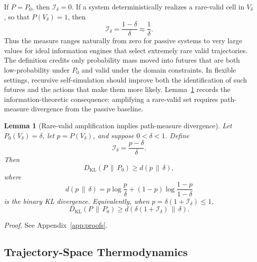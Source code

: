 \documentclass[
  aps,
  prresearch,
  reprint,
  amsmath,
  amssymb,
  superscriptaddress,
  nofootinbib,
  longbibliography
]{revtex4-2}
\newtheorem{lemma}{Lemma}
\newcommand{\KL}{D_{\mathrm{KL}}}
\newcommand{\calI}{\mathcal{I}}
\begin{document}
If \(P=P_0\), then \(\calI_\delta=0\). If a system deterministically realizes a rare-valid cell in \(V_\delta\), so that \(P(V_\delta)=1\), then
\begin{equation}
    \calI_\delta
    =
    \frac{1-\delta}{\delta}
    \approx
    \frac{1}{\delta}.
\end{equation}
Thus the measure ranges naturally from zero for passive systems to very large values for ideal information engines that select extremely rare valid trajectories. The definition credits only probability mass moved into futures that are both low-probability under \(P_0\) and valid under the domain constraints. In flexible settings, recursive self-simulation should improve both the identification of such futures and the actions that make them more likely. Lemma~\ref{lem:rare_valid_binary_kl} records the information-theoretic consequence: amplifying a rare-valid set requires path-measure divergence from the passive baseline.
\begin{lemma}[Rare-valid amplification implies path-measure divergence]
\label{lem:rare_valid_binary_kl}
Let \(P_0(V_\delta)=\delta\), let \(p=P(V_\delta)\), and suppose \(0<\delta<1\). Define
\begin{equation}
    \calI_\delta
    =
    \frac{p-\delta}{\delta}.
\end{equation}
Then
\begin{equation}
    \KL(P\,\|\,P_0)
    \geq
    d(p\,\|\,\delta),
    \label{eq:binary_kl_bridge}
\end{equation}
where
\begin{equation}
    d(p\,\|\,\delta)
    =
    p\log\frac{p}{\delta}
    +
    (1-p)\log\frac{1-p}{1-\delta}
\end{equation}
is the binary KL divergence. Equivalently, when \(p=\delta(1+\calI_\delta)\leq1\),
\begin{equation}
    \KL(P\,\|\,P_0)
    \geq
    d\!\left(\delta(1+\calI_\delta)\,\|\,\delta\right).
    \label{eq:Idelta_kl_bridge}
\end{equation}
\end{lemma}
\noindent\emph{Proof.} See Appendix~\ref{app:proofs}.

\subsection{Trajectory-Space Thermodynamics}
\label{sec:thermo}
\end{document}
